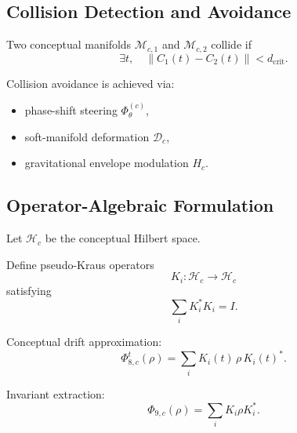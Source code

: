 \subsection{Collision Detection and Avoidance}

Two conceptual manifolds $\mathcal{M}_{c,1}$ and $\mathcal{M}_{c,2}$ collide if
\[
\exists t,\quad
\|C_1(t) - C_2(t)\| < d_{\text{crit}}.
\]

Collision avoidance is achieved via:
\begin{itemize}
  \item phase-shift steering $\Phi_\theta^{(c)}$,
  \item soft-manifold deformation $\mathcal{D}_c$,
  \item gravitational envelope modulation $H_c$.
\end{itemize}

\subsection{Operator-Algebraic Formulation}

Let $\mathcal{H}_c$ be the conceptual Hilbert space.

Define pseudo-Kraus operators
\[
K_i : \mathcal{H}_c \to \mathcal{H}_c
\]
satisfying
\[
\sum_i K_i^\ast K_i = I.
\]

Conceptual drift approximation:
\[
\Phi_{8,c}^t(\rho)
  = \sum_i K_i(t)\,\rho\,K_i(t)^\ast.
\]

Invariant extraction:
\[
\Phi_{9,c}(\rho)
  = \sum_i K_i \rho K_i^\ast.
\]

